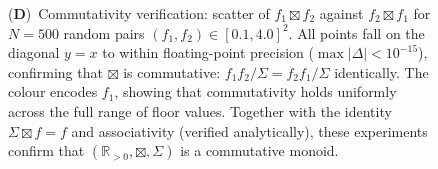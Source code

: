 \begin{figure}[!htbp]
{    (\textbf{D})~Commutativity verification: scatter of $f_1 \boxtimes f_2$ against $f_2 \boxtimes f_1$ for $N = 500$ random pairs $(f_1, f_2) \in [0.1, 4.0]^2$.  All points fall on the diagonal $y = x$ to within floating-point precision ($\max|\Delta| < 10^{-15}$), confirming that $\boxtimes$ is commutative: $f_1 f_2 / \Sigma = f_2 f_1 / \Sigma$ identically.  The colour encodes $f_1$, showing that commutativity holds uniformly across the full range of floor values.  Together with the identity $\Sigma \boxtimes f = f$ and associativity (verified analytically), these experiments confirm that $(\mathbb{R}_{>0}, \boxtimes, \Sigma)$ is a commutative monoid.}
    \label{fig:market_panel_1}
\end{figure}


